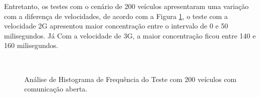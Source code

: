 \documentclass[
	12pt,				%
	oneside,			%
	a4paper,			%
	english,			%
	brazil				%
	]{abntex2ppgsi}
\begin{document}
Entretanto, os testes com o cenário de 200 veículos apresentaram uma variação com a diferença de velocidades, de acordo com a Figura \ref{fig:imgHistFreq200}, o teste com a velocidade 2G apresentou maior concentração entre o intervalo de 0 e 50 milisegundos. Já Com a velocidade de 3G, a maior concentração ficou entre 140 e 160 milisegundos.
 
\begin{figure}[h!]
	\caption{Análise de Histograma de Frequência do Teste  com 200 veículos com comunicação aberta.}
	\centering
	\label{fig:imgHistFreq200}
	\\
\end{figure}
\end{document}
